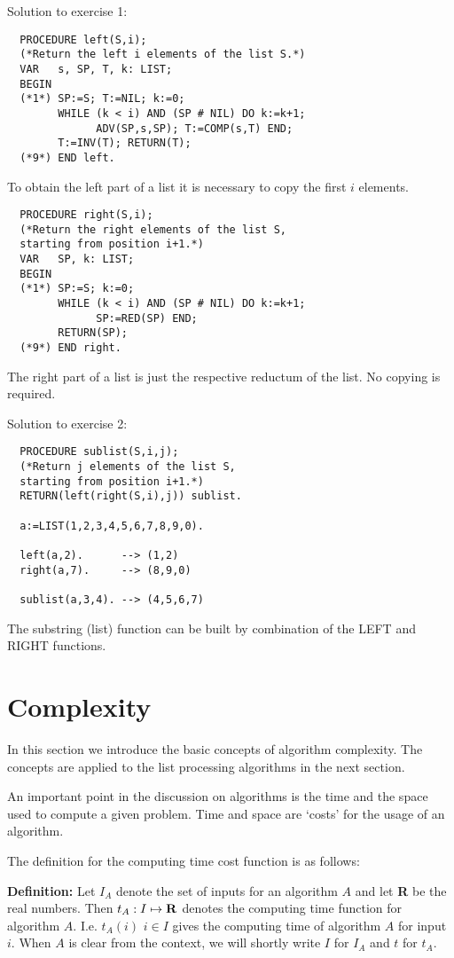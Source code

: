 Solution to exercise 1:
\begin{verbatim}
  PROCEDURE left(S,i);
  (*Return the left i elements of the list S.*)
  VAR   s, SP, T, k: LIST;
  BEGIN
  (*1*) SP:=S; T:=NIL; k:=0;
        WHILE (k < i) AND (SP # NIL) DO k:=k+1; 
              ADV(SP,s,SP); T:=COMP(s,T) END;
        T:=INV(T); RETURN(T);
  (*9*) END left.
\end{verbatim}
To obtain the left part of a list it is necessary to copy
the first $i$ elements. 

\begin{verbatim}
  PROCEDURE right(S,i);
  (*Return the right elements of the list S, 
  starting from position i+1.*)
  VAR   SP, k: LIST;
  BEGIN
  (*1*) SP:=S; k:=0;
        WHILE (k < i) AND (SP # NIL) DO k:=k+1; 
              SP:=RED(SP) END;
        RETURN(SP);
  (*9*) END right.
\end{verbatim}
The right part of a list is just the respective reductum 
of the list. No copying is required.

Solution to exercise 2:
\begin{verbatim}
  PROCEDURE sublist(S,i,j);
  (*Return j elements of the list S, 
  starting from position i+1.*)
  RETURN(left(right(S,i),j)) sublist.

  a:=LIST(1,2,3,4,5,6,7,8,9,0).

  left(a,2).      --> (1,2) 
  right(a,7).     --> (8,9,0) 

  sublist(a,3,4). --> (4,5,6,7) 
\end{verbatim}
The substring (list) function can be built by combination of the 
LEFT and RIGHT functions.



\section{Complexity}

\label{secCOMPL}
In this section we introduce the basic concepts of 
algorithm complexity. The concepts are applied to 
the list processing algorithms in the next section.

An important point in the 
discussion on algorithms is the time and the space
used to compute a given problem.
Time and space are `costs' for the usage of 
an algorithm. 

The definition for the computing time cost function 
is as follows:

{\bf Definition:} Let $I_A$ denote the set of inputs 
for an algorithm $A$ and let {\bf R} be the real numbers. 
Then $t_A : I \mapsto {\bf R}$ 
denotes the computing time function for algorithm $A$.
I.e. $t_A(i)$ $i \in I$ gives the computing time
of algorithm $A$ for input $i$.
When $A$ is clear from the context, we will
shortly write $I$ for $I_A$ and $t$ for $t_A$.


